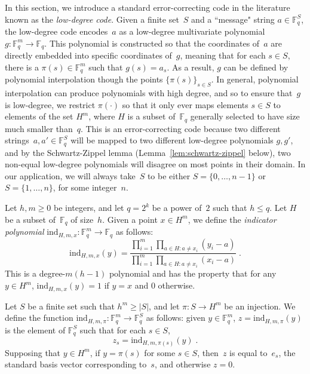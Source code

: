 \documentclass[11pt]{article}
\theoremstyle{definition}
\newcommand{\F}{\ensuremath{\mathbb{F}}}
\newcommand{\ind}{\ensuremath{\textrm{ind}}}
\begin{document}
In this section, we introduce a standard error-correcting code in the literature
known as the \emph{low-degree code}.
Given a finite set~$S$ and a ``message" string $a \in \F_q^S$, the low-degree
code encodes~$a$ as a low-degree multivariate polynomial $g:\F_q^m \rightarrow
\F_q$.
This polynomial is constructed so that the coordinates of~$a$ are directly
embedded into specific coordinates of~$g$, meaning that for each $s \in S$,
there is a $\pi(s) \in \F_q^m$ such that $g(s) = a_s$.
As a result, $g$ can be defined by polynomial interpolation though the points
$\{\pi(s)\}_{s \in S}$.
In general, polynomial interpolation can produce polynomials with high degree,
and so to ensure that~$g$ is low-degree, we restrict $\pi(\cdot)$ so that it
only ever maps elements $s \in S$ to elements of the set $H^m$, where $H$ is a
subset of~$\F_q$ generally selected to have size much smaller than~$q$.
This is an error-correcting code because two different strings~$a, a' \in
\F_q^S$ will be mapped to two different low-degree polynomials $g, g'$, and by
the Schwartz-Zippel lemma (Lemma~\ref{lem:schwartz-zippel} below), two non-equal
low-degree polynomials will disagree on most points in their domain.
In our application, we will always take~$S$ to be either $S = \{0, \ldots,
n-1\}$ or $S = \{1, \ldots, n\}$, for some integer~$n$.

Let $h, m \geq 0$ be integers, and let $q = 2^k$ be a power of~$2$ such that $h
\leq q$.
Let $H$ be a subset of~$\F_q$ of size~$h$.
Given a point $x \in H^m$, we define the \emph{indicator polynomial} $\ind_{H,m,
  x}:\F_q^m \rightarrow \F_q$ as follows:
\begin{equation*}
  \ind_{H, m, x}(y) = \frac{\prod_{i=1}^m \prod_{a \in H: a \neq x_i} (y_i -
    a)}{\prod_{i=1}^m \prod_{a \in H: a \neq x_i}(x_i - a)}\;.
\end{equation*}
This is a degree-$m (h-1)$ polynomial and has the property that for any $y \in
H^m$, $\ind_{H, m, x}(y) = 1$ if $y=x$ and $0$ otherwise.

Let $S$ be a finite set such that $h^m \geq |S|$, and let $\pi:S\rightarrow H^m$
be an injection.
We define the function $\ind_{H, m, \pi}:\F_q^m \rightarrow \F_q^S$ as follows:
given $y \in \F_q^m$, $z = \ind_{H,m,\pi}(y)$ is the element of $\F_q^S$ such
that for each $s \in S$,
\begin{equation*}
z_s = \ind_{H, m, \pi(s)}(y)\;.
\end{equation*}
Supposing that $y \in H^m$, if $y = \pi(s)$ for some $s \in S$, then~$z$ is
equal to~$e_s$, the standard basis vector corresponding to~$s$, and otherwise $z
= 0$.
\end{document}
